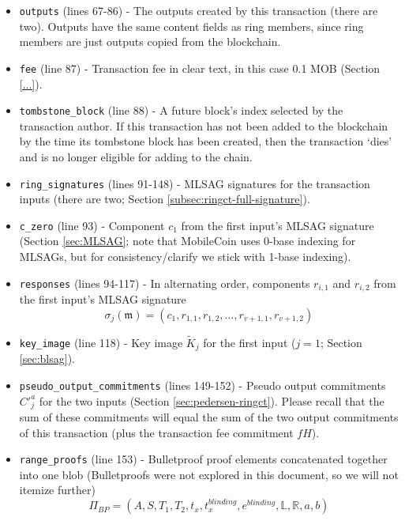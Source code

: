 \begin{appendices}
\begin{itemize}
    \item {\tt outputs} (lines 67-86) - The outputs created by this transaction (there are two). Outputs have the same content fields as ring members, since ring members are just outputs copied from the blockchain.
    \item {\tt fee} (line 87) - Transaction fee in clear text, in this case 0.1 MOB (Section \ref{...}).%
    \item {\tt tombstone\_block} (line 88) - A future block’s index selected by the transaction author. If this transaction has not been added to the blockchain by the time its tombstone block has been created, then the transaction `dies’ and is no longer eligible for adding to the chain.%

    \item {\tt ring\_signatures} (lines 91-148) - MLSAG signatures for the transaction inputs (there are two; Section \ref{subsec:ringct-full-signature}).
    \item {\tt c\_zero} (line 93) - Component \(c_1\) from the first input's MLSAG signature (Section \ref{sec:MLSAG}; note that MobileCoin uses 0-base indexing for MLSAGs, but for consistency/clarify we stick with 1-base indexing).
    \item {\tt responses} (lines 94-117) - In alternating order, components \(r_{i,1}\) and \(r_{i,2}\) from the first input's MLSAG signature\vspace{.175cm}
    \[\sigma_j(\mathfrak{m}) = (c_1, r_{1, 1}, r_{1, 2}, ..., r_{v+1, 1}, r_{v+1, 2})\]
    \item {\tt key\_image} (line 118) - Key image $\tilde{K}_j$ for the first input ($j = 1$; Section \ref{sec:blsag}).

    \item {\tt pseudo\_output\_commitments} (lines 149-152) - Pseudo output commitments $C'^a_j$ for the two inputs (Section  \ref{sec:pedersen-ringct}). Please recall that the sum of these commitments will equal the sum of the two output commitments of this transaction (plus the transaction fee commitment $f H$).
    \item {\tt range\_proofs} (line 153) - Bulletproof proof elements concatenated together into one blob (Bulletproofs were not explored in this document, so we will not itemize further)\vspace{.175cm}
    \[\Pi_{BP} = (A, S, T_1, T_2, t_x, t^{blinding}_x, e^{blinding}, \mathbb{L}, \mathbb{R}, a, b)\]
\end{itemize}





\end{appendices}
